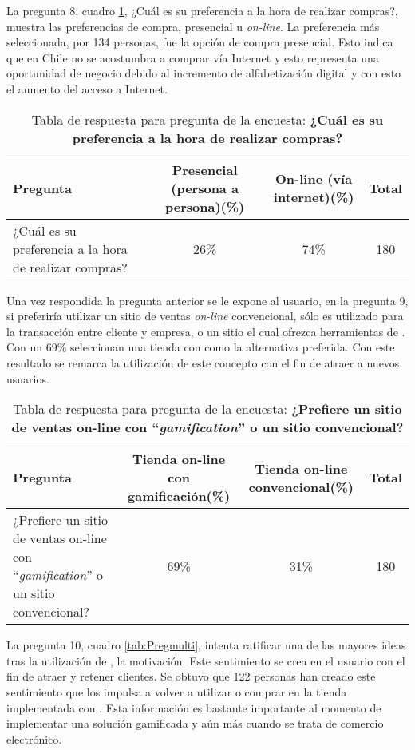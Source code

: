 La pregunta 8, cuadro \ref{tab:Preg8},
¿Cuál es su preferencia a la hora de realizar compras?,
muestra las preferencias  de compra, presencial u \emph{on-line}.
La preferencia más seleccionada, por 134 personas, fue la opción de compra
presencial.
Esto indica que en Chile no se acostumbra a comprar vía Internet y esto representa
una oportunidad de negocio debido al incremento de alfabetización digital y
con esto el aumento del acceso a Internet.

\begin{table}[h]
\centering
\footnotesize
\begin{tabular}{|p{6cm}|c|c|c|}
\hline
{\bf Pregunta} & {\bf Presencial (persona a persona)(\%)} & {\bf On-line (vía internet)(\%)} & {\bf Total}\\
\hline
¿Cuál es su preferencia a la hora de realizar compras?& 26\% & 74\% & 180 \\
\hline
\end{tabular}
\caption{Tabla de respuesta para pregunta de la encuesta: {\bf ¿Cuál es su preferencia a la hora de realizar compras?}}
\label{tab:Preg8}
\end{table}


Una vez respondida la pregunta anterior se le expone al usuario, en la pregunta 9,
si preferiría utilizar un sitio de ventas \emph{on-line} convencional, sólo es utilizado
para la transacción entre cliente y empresa, o un sitio el cual ofrezca
herramientas de {\gam}.
Con un 69\% seleccionan una tienda con {\gam} como la alternativa preferida.
Con este resultado se remarca la utilización de este concepto con el fin de atraer
a nuevos usuarios.

\begin{table}[h]
\centering
\footnotesize
\begin{tabular}{|p{6cm}|c|c|c|}
\hline
Pregunta & Tienda on-line con gamificación(\%) & Tienda on-line convencional(\%) & Total\\
\hline
¿Prefiere un sitio de ventas on-line con ``\emph{gamification}'' o un sitio convencional?& 69\% & 31\% & 180 \\
\hline
\end{tabular}
\caption{Tabla de respuesta para pregunta de la encuesta: {\bf ¿Prefiere un sitio de ventas on-line con 
``\emph{gamification}'' o un sitio convencional?}}
\label{tab:Preg9}
\end{table}


La pregunta 10, cuadro \ref{tab:Pregmulti}, intenta ratificar una de las mayores ideas tras la utilización
de {\gam}, la motivación.
Este sentimiento se crea en el usuario con el fin de atraer y retener clientes.
Se obtuvo que 122 personas han creado este sentimiento que los impulsa a volver
a utilizar o comprar en la tienda implementada con {\gam}.
Esta información es bastante importante al momento de implementar una solución
gamificada y aún más cuando se trata de comercio electrónico.


